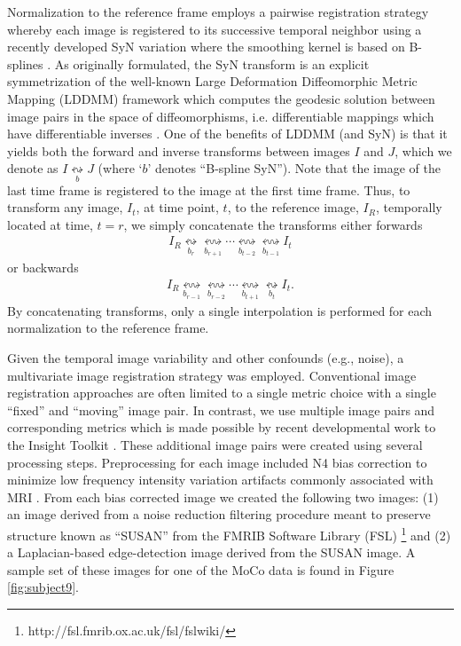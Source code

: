 \documentclass{llncs}
\begin{document}
Normalization to the reference frame employs a pairwise registration strategy
whereby each image is registered to its successive temporal neighbor using 
a recently developed SyN variation where the smoothing kernel is based on 
B-splines \cite{tustison2013}.  As originally formulated, the SyN transform
is an explicit symmetrization of the well-known Large Deformation Diffeomorphic 
Metric Mapping (LDDMM) framework \cite{beg2005} which computes the geodesic 
solution between image pairs in the space of diffeomorphisms, i.e. 
differentiable mappings which have differentiable inverses \cite{dupuis1998}.
One of the benefits of LDDMM (and SyN) is that it yields both 
the forward and inverse transforms between images $I$ and $J$, which we denote
as $I \underset{b}{\leftrightsquigarrow} J$ (where `$b$' denotes ``B-spline SyN'').
Note that the image of the last time frame is registered to the image at the 
first time frame.  Thus, to transform any image, $I_t$, at time point, $t$, to the 
reference image, $I_R$, temporally located at time, $t=r$, we simply concatenate 
the transforms either forwards
\begin{align}
I_R  \underset{b_r}{\leftrightsquigarrow} \underset{b_{r+1}}{\leftrightsquigarrow} \cdots
      \underset{b_{t-2}}{\leftrightsquigarrow}\underset{b_{t-1}}{\leftrightsquigarrow} I_t
\end{align}
or backwards
\begin{align}
I_R  \underset{b_{r-1}}{\leftrightsquigarrow} \underset{b_{r-2}}{\leftrightsquigarrow} \cdots
      \underset{b_{t+1}}{\leftrightsquigarrow}\underset{b_t}{\leftrightsquigarrow} I_t.
\end{align}
By concatenating transforms, only a single
interpolation is performed for each normalization to the reference frame.  

Given the temporal image variability and other confounds (e.g., noise), 
a multivariate image registration strategy was employed.  Conventional
image registration approaches are often limited to a single metric choice
with a single ``fixed'' and ``moving'' image pair.  In contrast, we 
use multiple image
pairs and corresponding metrics which is made possible by recent 
developmental work to the Insight Toolkit \cite{avants2014}.  
These additional image pairs were created using several processing steps.
Preprocessing for each image included N4 bias correction to minimize low frequency
intensity variation artifacts commonly associated with MRI \cite{tustison2010}.  From each
bias corrected image we created the following two images:  (1) an image derived
from a noise reduction filtering procedure meant to preserve structure 
\cite{smith1997} known as ``SUSAN'' from the FMRIB Software Library (FSL)%
\footnote{
http://fsl.fmrib.ox.ac.uk/fsl/fslwiki/
}
and (2) a Laplacian-based edge-detection image
derived from the SUSAN image.  A sample set of these images for one of the MoCo
data is found in Figure \ref{fig:subject9}.
\end{document}
